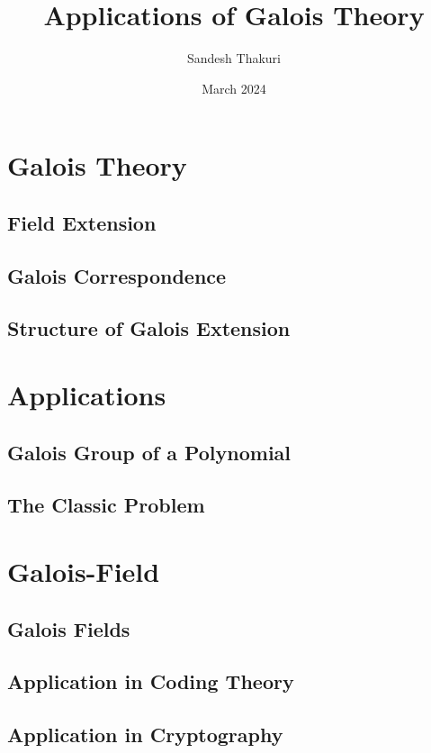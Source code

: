 \documentclass[a4paper,12pt,oneside,onecolumn,openany,final]{memoir}
\title{Applications of Galois Theory}
\author{Sandesh Thakuri}
\date{March 2024}
\begin{document}
\frontmatter








\tableofcontents  %

\mainmatter



\part{Galois Theory}
\chapter{Field Extension}


\chapter{Galois Correspondence}


\chapter{Structure of Galois Extension}




\part{Applications}
\chapter{Galois Group of a Polynomial}


\chapter{The Classic Problem}


\part{Galois-Field}
\chapter{Galois Fields}


\chapter{Application in Coding Theory}


\chapter{Application in Cryptography}


\backmatter


\end{document}
